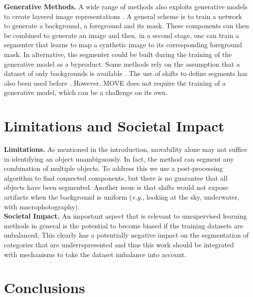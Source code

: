 \documentclass{article}
\newcommand\eg{\emph{e.g.}}
\newcommand\methodname{MOVE\xspace}
\begin{document}
\noindent\textbf{Generative Methods.} 
A wide range of methods also exploits generative models to create layered image representations \cite{van2018case,kwak2016generating,bielski2019emergence,yang2017lr,eslami2016attend,he2021ganseg,yang_loquercio_2019,savarese2020information}.
A general scheme is to train a network to generate a background, a foreground and its mask. These components can then be combined to generate an image and then, in a second stage, one can train a segmenter that learns to map a synthetic image to its corresponding foreground mask. In alternative, the segmenter could be built during the training of the generative model as a byproduct.
Some methods rely on the assumption that a dataset of only backgrounds is available \cite{benny2020onegan,Ostyakov2018}.
The use of shifts to define segments has also been used before \cite{Remez_2018_ECCV,bielski2019emergence,arandjelovic2019object}. However, \methodname does not require the training of a generative model, which can be a challenge on its own.







\section{Limitations and Societal Impact}
\label{sec:limitation}

\noindent\textbf{Limitations. }As mentioned in the introduction, movability alone may not suffice in identifying an object unambiguously. In fact, the method can segment any combination of multiple objects. To address this we use a post-processing algorithm to find connected components, but there is no guarantee that all objects have been segmented. Another issue is that shifts would not expose artifacts when the background is uniform (\eg, looking at the sky, underwater, with macrophotography).\\
\noindent\textbf{Societal Impact. }An important aspect that is relevant to unsupervised learning methods in general is the potential to become biased if the training datasets are unbalanced. This clearly has a potentially negative impact on the segmentation of categories that are underrepresented and thus this work should be integrated with mechanisms to take the dataset imbalance into account.


\section{Conclusions}
\end{document}
